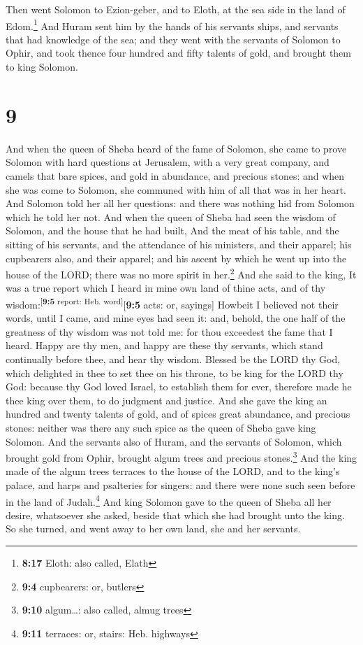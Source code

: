  Then went Solomon to Ezion-geber, and to Eloth, at the
sea side in the land of Edom.\footnote{\textbf{8:17} Eloth: also called,
  Elath}  And Huram sent him by the hands of his servants
ships, and servants that had knowledge of the sea; and they went with
the servants of Solomon to Ophir, and took thence four hundred and fifty
talents of gold, and brought them to king Solomon.

\hypertarget{section-8}{%
\section{9}\label{section-8}}

 And when the queen of Sheba heard of the fame of Solomon,
she came to prove Solomon with hard questions at Jerusalem, with a very
great company, and camels that bare spices, and gold in abundance, and
precious stones: and when she was come to Solomon, she communed with him
of all that was in her heart.  And Solomon told her all
her questions: and there was nothing hid from Solomon which he told her
not.  And when the queen of Sheba had seen the wisdom of
Solomon, and the house that he had built,  And the meat of
his table, and the sitting of his servants, and the attendance of his
ministers, and their apparel; his cupbearers also, and their apparel;
and his ascent by which he went up into the house of the LORD; there was
no more spirit in her.\footnote{\textbf{9:4} cupbearers: or, butlers}
 And she said to the king, It was a true report which I
heard in mine own land of thine acts, and of thy
wisdom:\textsuperscript{{[}\textbf{9:5} report: Heb.
word{]}}{[}\textbf{9:5} acts: or, sayings{]}  Howbeit I
believed not their words, until I came, and mine eyes had seen it: and,
behold, the one half of the greatness of thy wisdom was not told me: for
thou exceedest the fame that I heard.  Happy are thy men,
and happy are these thy servants, which stand continually before thee,
and hear thy wisdom.  Blessed be the LORD thy God, which
delighted in thee to set thee on his throne, to be king for the LORD thy
God: because thy God loved Israel, to establish them for ever, therefore
made he thee king over them, to do judgment and justice. 
And she gave the king an hundred and twenty talents of gold, and of
spices great abundance, and precious stones: neither was there any such
spice as the queen of Sheba gave king Solomon.  And the
servants also of Huram, and the servants of Solomon, which brought gold
from Ophir, brought algum trees and precious stones.\footnote{\textbf{9:10}
  algum\ldots: also called, almug trees}  And the king
made of the algum trees terraces to the house of the LORD, and to the
king's palace, and harps and psalteries for singers: and there were none
such seen before in the land of Judah.\footnote{\textbf{9:11} terraces:
  or, stairs: Heb. highways}  And king Solomon gave to
the queen of Sheba all her desire, whatsoever she asked, beside that
which she had brought unto the king. So she turned, and went away to her
own land, she and her servants.

